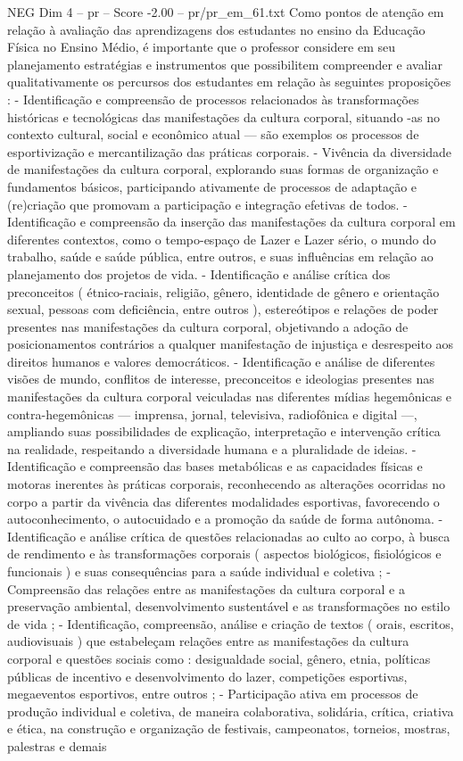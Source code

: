 \begin{textsample}{NEG Dim 4 – pr – Score -2.00 – pr/pr\_em\_61.txt}
Como pontos de atenção em relação à avaliação das aprendizagens dos estudantes no ensino da Educação Física no Ensino Médio, é importante que o professor considere em seu planejamento estratégias e instrumentos que possibilitem compreender e avaliar qualitativamente os percursos dos estudantes em relação às seguintes proposições : - Identificação e compreensão de processos relacionados às transformações históricas e tecnológicas das manifestações da cultura corporal, situando -as no contexto cultural, social e econômico atual — são exemplos os processos de esportivização e mercantilização das práticas corporais. - Vivência da diversidade de manifestações da cultura corporal, explorando suas formas de organização e fundamentos básicos, participando ativamente de processos de adaptação e (re)criação que promovam a participação e integração efetivas de todos. - Identificação e compreensão da inserção das manifestações da cultura corporal em diferentes contextos, como o tempo-espaço de Lazer e Lazer sério, o mundo do trabalho, saúde e saúde pública, entre outros, e suas influências em relação ao planejamento dos projetos de vida. - Identificação e análise crítica dos preconceitos ( étnico-raciais, religião, gênero, identidade de gênero e orientação sexual, pessoas com deficiência, entre outros ), estereótipos e relações de poder presentes nas manifestações da cultura corporal, objetivando a adoção de posicionamentos contrários a qualquer manifestação de injustiça e desrespeito aos direitos humanos e valores democráticos. - Identificação e análise de diferentes visões de mundo, conflitos de interesse, preconceitos e ideologias presentes nas manifestações da cultura corporal veiculadas nas diferentes mídias hegemônicas e contra-hegemônicas — imprensa, jornal, televisiva, radiofônica e digital —, ampliando suas possibilidades de explicação, interpretação e intervenção crítica na realidade, respeitando a diversidade humana e a pluralidade de ideias. - Identificação e compreensão das bases metabólicas e as capacidades físicas e motoras inerentes às práticas corporais, reconhecendo as alterações ocorridas no corpo a partir da vivência das diferentes modalidades esportivas, favorecendo o autoconhecimento, o autocuidado e a promoção da saúde de forma autônoma. - Identificação e análise crítica de questões relacionadas ao culto ao corpo, à busca de rendimento e às transformações corporais ( aspectos biológicos, fisiológicos e funcionais ) e suas consequências para a saúde individual e coletiva ; - Compreensão das relações entre as manifestações da cultura corporal e a preservação ambiental, desenvolvimento sustentável e as transformações no estilo de vida ; - Identificação, compreensão, análise e criação de textos ( orais, escritos, audiovisuais ) que estabeleçam relações entre as manifestações da cultura corporal e questões sociais como : desigualdade social, gênero, etnia, políticas públicas de incentivo e desenvolvimento do lazer, competições esportivas, megaeventos esportivos, entre outros ; - Participação ativa em processos de produção individual e coletiva, de maneira colaborativa, solidária, crítica, criativa e ética, na construção e organização de festivais, campeonatos, torneios, mostras, palestras e demais 
\end{textsample}
